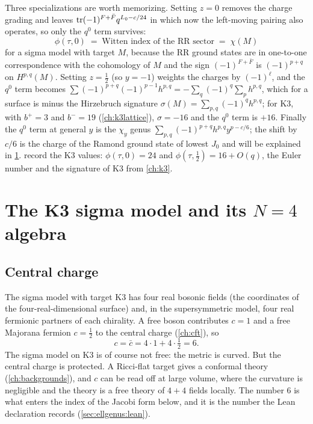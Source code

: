 Three specializations are worth memorizing. Setting $z=0$ removes the charge grading and
leaves $\operatorname{tr}(-1)^{F+\bar F}q^{L_0-c/24}$ in which now the left-moving pairing also operates,
so only the $q^0$ term survives:
\begin{equation}\label{eq:ellgenus:z0}
 \phi(\tau,0) \;=\; \text{Witten index of the RR sector} \;=\; \chi(M)
\end{equation}
for a sigma model with target $M$, because the RR ground states are in one-to-one
correspondence with the cohomology of $M$ and the sign $(-1)^{F+\bar F}$ is $(-1)^{p+q}$ on
$H^{p,q}(M)$. Setting $z=\tfrac12$ (so $y=-1$) weights the charges by $(-1)^\ell$, and the
$q^0$ term becomes $\sum(-1)^{p+q}(-1)^{p-1}h^{p,q}=-\sum_q(-1)^q\sum_p h^{p,q}$, which for a
surface is minus the Hirzebruch signature $\sigma(M)=\sum_{p,q}(-1)^qh^{p,q}$; for K3, with
$b^+=3$ and $b^-=19$ (\cref{ch:k3lattice}), $\sigma=-16$ and the $q^0$ term is $+16$.
Finally the $q^0$ term at
general $y$ is the $\chi_y$ genus $\sum_{p,q}(-1)^{p+q}h^{p,q}y^{p-c/6}$; the shift by $c/6$ is
the charge of the Ramond ground state of lowest $J_0$ and will be explained in
\cref{sec:ellgenus:n4}.  record the K3 values: $\phi(\tau,0)=24$
and $\phi(\tau,\tfrac12)=16+O(q)$, the Euler number and the signature of K3 from \cref{ch:k3}.

\section{The K3 sigma model and its \texorpdfstring{$N=4$}{N = 4} algebra}\label{sec:ellgenus:n4}

\subsection{Central charge}

The sigma model with target K3 has four real bosonic fields (the coordinates of the
four-real-dimensional surface) and, in the supersymmetric model, four real fermionic
partners of each chirality. A free boson contributes $c=1$ and a free Majorana fermion
$c=\tfrac12$ to the central charge (\cref{ch:cft}), so
\begin{equation}\label{eq:ellgenus:c6}
 c=\bar c=4\cdot1+4\cdot\tfrac12=6 .
\end{equation}
The sigma model on K3 is of course not free: the metric is curved. But the central charge is
protected. A Ricci-flat target gives a conformal theory (\cref{ch:backgrounds}), and $c$ can
be read off at large volume, where the curvature is negligible and the theory is a free
theory of $4+4$ fields locally. The number $6$ is what enters the index of the Jacobi form
below, and it is the number the Lean declaration  records
(\cref{sec:ellgenus:lean}).

